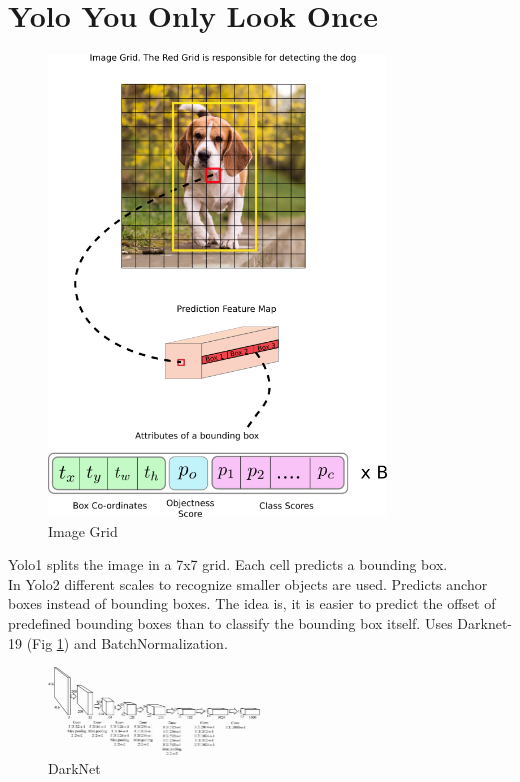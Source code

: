 \section{Yolo You Only Look Once}

\begin{figure}
  \centering
  \includegraphics[width=0.8\textwidth]{images/yolo/grid.png}
  \caption{Image Grid}
\end{figure}

Yolo1 splits the image in a 7x7 grid. Each cell predicts a bounding box.\\

In Yolo2 different scales to recognize smaller objects are used. Predicts anchor boxes instead of bounding boxes. The idea is, it is easier to predict the offset of predefined bounding boxes than to classify the bounding box itself. Uses Darknet-19 (Fig \ref{fig:darknet}) and BatchNormalization.

\begin{figure}[H]
  \centering
  \includegraphics[width=0.5\textwidth]{images/yolo/darknet.png}
  \caption{DarkNet}
  \label{fig:darknet}
\end{figure}

